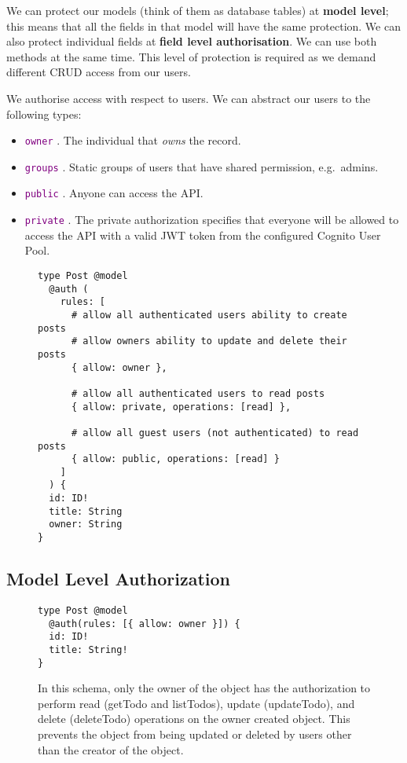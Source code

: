 \documentclass{tufte-handout}
\providecommand{\tightlist}{%
  \setlength{\itemsep}{0pt}\setlength{\parskip}{0pt}}
\newcommand{\cde}[1]{
  \textcolor{purple}{\texttt{#1}}
}
\begin{document}
We can protect our models (think of them as database tables) at
\textbf{model level}; this means that all the fields in that model will
have the same protection. We can also protect individual fields at
\textbf{field level authorisation}. We can use both methods at the same
time. This level of protection is required as we demand different CRUD
access from our users.

We authorise access with respect to users. We can abstract our users to
the following types:

\begin{itemize}
\tightlist
\item
  \cde{owner}. The individual that \emph{owns} the record.
\item
  \cde{groups}. Static groups of users that have shared permission,
  e.g.~admins.
\item
  \cde{public}. Anyone can access the API.
\item
  \cde{private}. The private authorization specifies that everyone will
  be allowed to access the API with a valid JWT token from the
  configured Cognito User Pool.
\end{itemize}

\begin{figure}[h]
\begin{lstlisting}
type Post @model
  @auth (
    rules: [
      # allow all authenticated users ability to create posts
      # allow owners ability to update and delete their posts
      { allow: owner },

      # allow all authenticated users to read posts
      { allow: private, operations: [read] },

      # allow all guest users (not authenticated) to read posts
      { allow: public, operations: [read] }
    ]
  ) {
  id: ID!
  title: String
  owner: String
}
\end{lstlisting}
\end{figure}

\hypertarget{model-level-authorization}{%
\subsection{Model Level Authorization}\label{model-level-authorization}}

\begin{figure}[h]
\caption{In this schema, only the owner of the object has the authorization to perform read (getTodo and listTodos), update (updateTodo), and delete (deleteTodo) operations on the owner created object. This prevents the object from being updated or deleted by users other than the creator of the object.}
\begin{lstlisting}
type Post @model
  @auth(rules: [{ allow: owner }]) {
  id: ID!
  title: String!
}
\end{lstlisting}
\end{figure}
\end{document}
